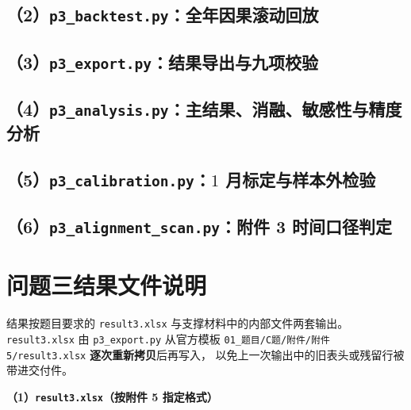 \documentclass[withoutpreface,bwprint]{cumcmthesis}
\begin{document}
\begin{appendices}
\subsection*{（2）\texttt{p3\_backtest.py}：全年因果滚动回放}


\subsection*{（3）\texttt{p3\_export.py}：结果导出与九项校验}


\subsection*{（4）\texttt{p3\_analysis.py}：主结果、消融、敏感性与精度分析}


\subsection*{（5）\texttt{p3\_calibration.py}：$1$ 月标定与样本外检验}


\subsection*{（6）\texttt{p3\_alignment\_scan.py}：附件 3 时间口径判定}


\section{问题三结果文件说明}

结果按题目要求的 \texttt{result3.xlsx} 与支撑材料中的内部文件两套输出。
\texttt{result3.xlsx} 由 \texttt{p3\_export.py} 从官方模板
\texttt{01\_题目/C题/附件/附件5/result3.xlsx} \textbf{逐次重新拷贝}后再写入，
以免上一次输出中的旧表头或残留行被带进交付件。

\textbf{（1）\texttt{result3.xlsx}（按附件 5 指定格式）}


\end{appendices}
\end{document}
